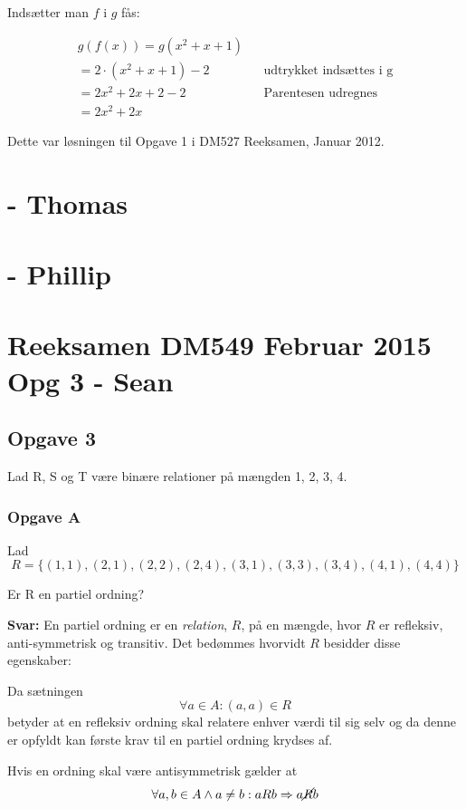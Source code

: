 \documentclass{article}
\begin{document}
Indsætter man $f$ i $g$ fås:
\begin{center}
\begin{align*}
g(f(x)) = g(x^2 + x + 1) \\
= 2 \cdot (x^2 + x + 1) - 2 && \text{udtrykket indsættes i g} \\
= 2x^2 + 2x + 2 - 2 && \text{Parentesen udregnes} \\
= 2x^2 + 2x
\end{align*}
\end{center}

Dette var løsningen til Opgave 1 i DM527 Reeksamen, Januar 2012.

\section{- Thomas}

\section{- Phillip}

\section{Reeksamen DM549 Februar 2015 Opg 3 - Sean }
\subsection{Opgave 3}
Lad R, S og T være binære relationer på mængden {1, 2, 3, 4}.


\subsubsection{Opgave A}
Lad \[R = \{(1, 1),(2, 1),(2, 2),(2, 4),(3, 1),(3, 3),(3, 4),(4, 1),(4, 4)\}\]

Er R en partiel ordning?

\textbf{Svar:}
{En partiel ordning er en \emph{relation}, $R$, på en mængde,  hvor $R$ er refleksiv, anti-symmetrisk og transitiv. Det bedømmes hvorvidt $R$ besidder disse egenskaber:}


Da sætningen \[\forall a \in A : (a,a) \in R\] betyder at en refleksiv ordning skal relatere enhver værdi til sig selv og da denne er opfyldt kan første krav til en partiel ordning krydses af.





Hvis en ordning skal være antisymmetrisk gælder at \[\forall a, b \in A \land a \neq b: aRb \Rightarrow a\cancel{R}b\]\\
\end{document}
